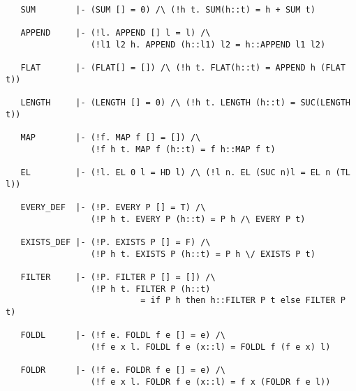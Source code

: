 {\begin{hol}
\begin{verbatim}
   SUM        |- (SUM [] = 0) /\ (!h t. SUM(h::t) = h + SUM t)

   APPEND     |- (!l. APPEND [] l = l) /\
                 (!l1 l2 h. APPEND (h::l1) l2 = h::APPEND l1 l2)

   FLAT       |- (FLAT[] = []) /\ (!h t. FLAT(h::t) = APPEND h (FLAT t))

   LENGTH     |- (LENGTH [] = 0) /\ (!h t. LENGTH (h::t) = SUC(LENGTH t))

   MAP        |- (!f. MAP f [] = []) /\
                 (!f h t. MAP f (h::t) = f h::MAP f t)

   EL         |- (!l. EL 0 l = HD l) /\ (!l n. EL (SUC n)l = EL n (TL l))

   EVERY_DEF  |- (!P. EVERY P [] = T) /\
                 (!P h t. EVERY P (h::t) = P h /\ EVERY P t)

   EXISTS_DEF |- (!P. EXISTS P [] = F) /\
                 (!P h t. EXISTS P (h::t) = P h \/ EXISTS P t)

   FILTER     |- (!P. FILTER P [] = []) /\
                 (!P h t. FILTER P (h::t)
                           = if P h then h::FILTER P t else FILTER P t)

   FOLDL      |- (!f e. FOLDL f e [] = e) /\
                 (!f e x l. FOLDL f e (x::l) = FOLDL f (f e x) l)

   FOLDR      |- (!f e. FOLDR f e [] = e) /\
                 (!f e x l. FOLDR f e (x::l) = f x (FOLDR f e l))


\end{verbatim}
\end{hol}}
